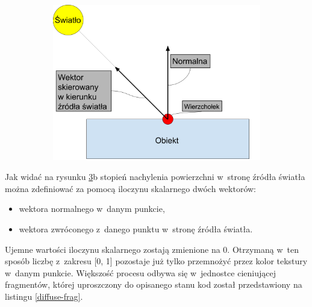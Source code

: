 \documentclass[a4paper,twoside,12pt]{book}
\begin{document}
\begin{itemize}
\begin{figure}[H]
\begin{subfigure}[b]{0.4\textwidth}
            \label{fig:diffuse_brightness}
        \end{subfigure}
        ~ %
        \begin{subfigure}[b]{0.5\textwidth}
            \includegraphics[width=\textwidth]{res/diffuse_vectors.png}
            \label{fig:diffuse_vectors}
        \end{subfigure}
        \label{fig:diffuse}
    \end{figure}
    Jak widać na rysunku \ref{fig:diffuse}b stopień nachylenia powierzchni w~stronę źródła światła można zdefiniować za pomocą iloczynu skalarnego dwóch wektorów:
    \begin{itemize}
        \item wektora normalnego w~danym punkcie,
        \item wektora zwróconego z~danego punktu w~stronę źródła światła.
    \end{itemize}
    Ujemne wartości iloczynu skalarnego zostają zmienione na 0. Otrzymaną w~ten sposób liczbę z~zakresu [0, 1] pozostaje już tylko przemnożyć przez kolor tekstury w~danym punkcie. Większość procesu odbywa się w~jednostce cieniującej fragmentów, której uproszczony do opisanego stanu kod został przedstawiony na listingu \ref{diffuse-frag}.
    

\end{itemize}
\end{document}
